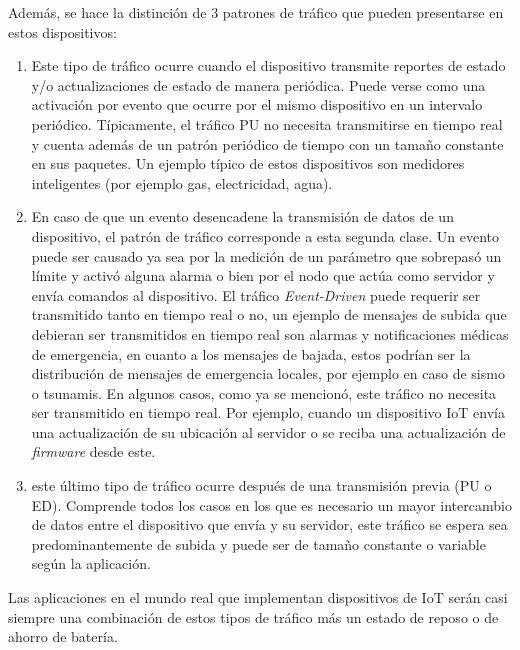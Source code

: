 Además, se hace  la distinción de 3 patrones de tráfico que pueden presentarse en estos dispositivos:

\begin{enumerate}
    \item {}\textit{}\underbar{):} Este tipo de tráfico ocurre cuando el dispositivo transmite reportes de estado y/o actualizaciones de estado de manera periódica. Puede verse como una activación por evento que ocurre por el mismo dispositivo en un intervalo periódico. Típicamente, el tráfico PU no necesita transmitirse en tiempo real y cuenta además de un patrón periódico de tiempo con un tamaño constante en sus paquetes. Un ejemplo típico de estos dispositivos son medidores inteligentes (por ejemplo gas, electricidad, agua).
    \item {}\textit{}\underbar{):} En caso de que un evento desencadene la transmisión de datos de un dispositivo, el patrón de tráfico corresponde a esta segunda clase. Un evento puede ser causado ya sea por la medición de un parámetro que sobrepasó un límite y activó alguna alarma o bien por el nodo que actúa como servidor y envía comandos al dispositivo. El tráfico \textit{Event-Driven} puede requerir ser transmitido tanto en tiempo real o no, un ejemplo de mensajes de subida que debieran ser transmitidos en tiempo real son alarmas y notificaciones médicas de emergencia, en cuanto a los mensajes de bajada, estos podrían ser la distribución de mensajes de emergencia locales, por ejemplo en caso de sismo o tsunamis. En algunos casos, como ya se mencionó, este tráfico no necesita ser transmitido en tiempo real. Por ejemplo, cuando un dispositivo IoT envía una actualización de su ubicación al servidor o se reciba una actualización de \textit{firmware }desde este.
    \item {}\textit{}\underbar{):} este último tipo de tráfico ocurre después de una transmisión previa (PU o ED). Comprende todos los casos en los que es necesario un mayor intercambio de datos entre el dispositivo que envía y su servidor, este tráfico se espera sea predominantemente de subida y puede ser de tamaño constante o variable según la aplicación.\newline
\end{enumerate}

Las aplicaciones en el mundo real que implementan dispositivos de IoT serán casi siempre una combinación de estos tipos de tráfico más un estado de reposo o de ahorro de batería.\newline

